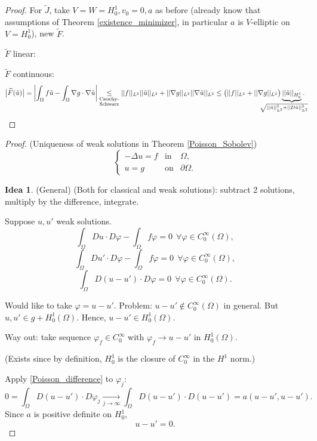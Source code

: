 \documentclass[12pt]{article}
\theoremstyle{definition}
\newtheorem*{idea}{Idea}
\begin{document}
\begin{proof}
For $\widetilde J$, take $V=W=H_0^1,v_0=0,a$ as before (already know that assumptions of Theorem \ref{existence_minimizer}, in particular $a$ is $V$-elliptic on $V=H_0^1$), new $\widetilde F$.

$\widetilde F$ linear: \checkmark

$\widetilde F$ continuous:
\[\big|\widetilde F(\tilde u)\big|=\left|\int_\Omega f\tilde u-\int_\Omega\nabla g\cdot\nabla\tilde u\right|\underset{\substack{\text{Cauchy-}\\\text{Schwarz}}}\leq||f||_{L^2}||\tilde u||_{L^2}+||\nabla g||_{L^2}||\nabla\tilde u||_{L^2}\leq\big(||f||_{L^2}+||\nabla g||_{L^2}\big)\underbrace{||\tilde u||_{H_0^1}}_{\mathclap{\sqrt{||\tilde u||_{L^2}^2+||D\tilde u||_{L^2}^2}\hspace{8mm}}}.\]
\end{proof}

\begin{proof}
(Uniqueness of weak solutions in Theorem \ref{Poisson_Sobolev})
\[\left\{\begin{array}{rcl}-\Delta u=f&\text{in}&\Omega,\\u=g&\text{on}&\partial\Omega.\end{array}\right.\]

\begin{idea}
(General) (Both for classical and weak solutions): subtract 2 solutions, multiply by the difference, integrate.
\end{idea}

Suppose $u,u'$ weak solutions.
\[\int_\Omega Du\cdot D\varphi-\int_\Omega f\varphi=0\ \ \forall\varphi\in C_0^\infty(\Omega),\]
\[\int_\Omega Du'\cdot D\varphi-\int_\Omega f\varphi=0\ \ \forall\varphi\in C_0^\infty(\Omega),\]
\begin{equation}\tag{$*$}\label{Poisson_difference}
\int_\Omega D(u-u')\cdot D\varphi=0\ \ \forall\varphi\in C_0^\infty(\Omega).
\end{equation}

Would like to take $\varphi=u-u'$. Problem: $u-u'\notin C_0^\infty(\Omega)$ in general. But $u,u'\in g+H_0^1(\Omega)$. Hence, $u-u'\in H_0^1(\Omega)$.

Way out: take sequence $\varphi_f\in C_0^\infty$ with $\varphi_f\rightarrow u-u'$ in $H_0^1(\Omega)$.

(Exists since by definition, $H_0^1$ is the closure of $C_0^\infty$ in the $H^1$ norm.)

Apply \eqref{Poisson_difference} to $\varphi_j$:
\[0=\int_\Omega D(u-u')\cdot D\varphi_j\xrightarrow[j\to\infty]{}\int_\Omega D(u-u')\cdot D(u-u')=a(u-u',u-u').\]
Since $a$ is positive definite on $H_0^1$,
\[u-u'=0.\]
\end{proof}
\end{document}
